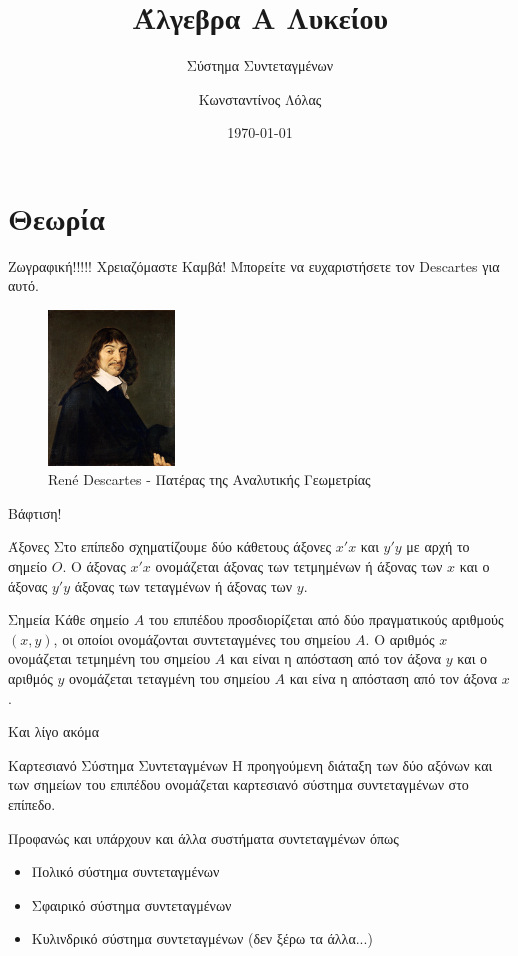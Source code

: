 \documentclass{../../presentation}
\title{Άλγεβρα Α Λυκείου}
\subtitle{Σύστημα Συντεταγμένων}
\author[Λόλας]{Κωνσταντίνος Λόλας}
\date{\today}
\begin{document}
\frame{\titlepage}

\section{Θεωρία}

\begin{frame}{Ζωγραφική!!!!!}
  Χρειαζόμαστε Καμβά! Μπορείτε να ευχαριστήσετε τον Descartes για αυτό.
  \begin{figure}
    \centering
    \includegraphics[width=0.3\textwidth]{images/Descartes}
    \caption{René Descartes - Πατέρας της Αναλυτικής Γεωμετρίας}
  \end{figure}
\end{frame}

\begin{frame}{Βάφτιση!}
  \begin{block}{Άξονες}
    Στο επίπεδο σχηματίζουμε δύο κάθετους άξονες $x'x$ και $y'y$ με αρχή το σημείο $O$. Ο άξονας $x'x$ ονομάζεται άξονας των τετμημένων ή άξονας των $x$ και ο άξονας $y'y$ άξονας των τεταγμένων ή άξονας των $y$.
  \end{block}
  \begin{block}{Σημεία}
    Κάθε σημείο $A$ του επιπέδου προσδιορίζεται από δύο πραγματικούς αριθμούς $(x,y)$, οι οποίοι ονομάζονται συντεταγμένες του σημείου $A$. Ο αριθμός $x$ ονομάζεται τετμημένη του σημείου $A$ και είναι η απόσταση από τον άξονα $y$ και ο αριθμός $y$ ονομάζεται τεταγμένη του σημείου $A$ και είνα η απόσταση από τον άξονα $x$.
  \end{block}
\end{frame}

\begin{frame}{Και λίγο ακόμα}
  \begin{block}{Καρτεσιανό Σύστημα Συντεταγμένων}
    Η προηγούμενη διάταξη των δύο αξόνων και των σημείων του επιπέδου ονομάζεται καρτεσιανό σύστημα συντεταγμένων στο επίπεδο.
  \end{block}
  Προφανώς και υπάρχουν και άλλα συστήματα συντεταγμένων όπως
  \begin{itemize}
    \item Πολικό σύστημα συντεταγμένων
    \item Σφαιρικό σύστημα συντεταγμένων
    \item Κυλινδρικό σύστημα συντεταγμένων (δεν ξέρω τα άλλα...)
  \end{itemize}
\end{frame}
\end{document}

